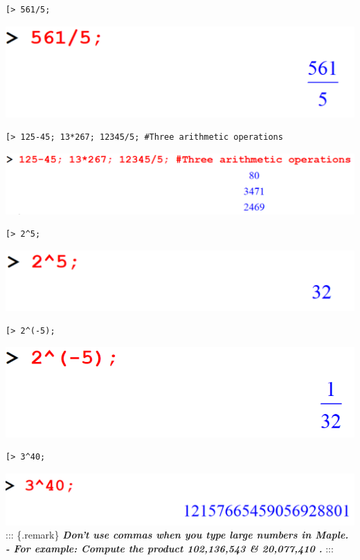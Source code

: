 \documentclass[
]{book}
\theoremstyle{definition}
\theoremstyle{definition}
\theoremstyle{definition}
\theoremstyle{definition}
\theoremstyle{remark}
\begin{document}
\begin{verbatim}
[> 561/5;
\end{verbatim}

\includegraphics{figures/Lesson 1/fig8.png}

\begin{verbatim}
[> 125-45; 13*267; 12345/5; #Three arithmetic operations
\end{verbatim}

\includegraphics{figures/Lesson 1/fig9.png}

\begin{verbatim}
[> 2^5;
\end{verbatim}

\includegraphics{figures/Lesson 1/fig10.png}

\begin{verbatim}
[> 2^(-5);
\end{verbatim}

\includegraphics{figures/Lesson 1/fig11.png}

\begin{verbatim}
[> 3^40;
\end{verbatim}

\includegraphics{figures/Lesson 1/fig12.png}
::: \{.remark\}
\textbf{\emph{Don't use commas when you type large numbers in Maple.
- For example: Compute the product 102,136,543 \& 20,077,410 .}}
:::
\end{document}
